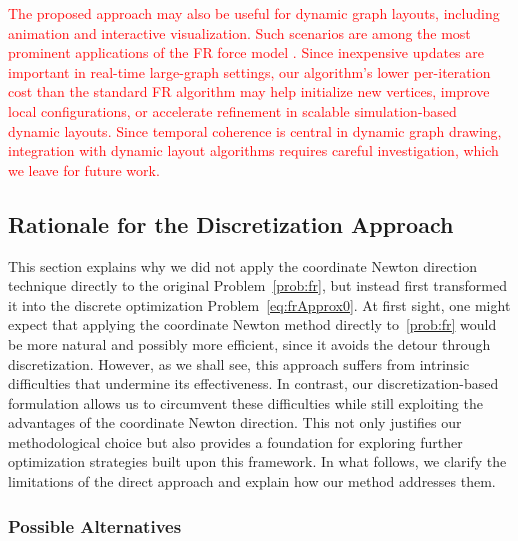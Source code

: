 \documentclass[11pt]{article}
\newcommand{\red}[1]{\textcolor{red}{#1}}
\begin{document}
\red{
  The proposed approach may also be useful for dynamic graph layouts, including animation and interactive visualization. Such scenarios are among the most prominent applications of the FR force model \citep{ertenGraphAELGraphAnimations2004,frishmanOnlineDynamicGraph2008}.
  Since inexpensive updates are important in real-time large-graph settings, our algorithm's lower per-iteration cost than the standard FR algorithm may help initialize new vertices, improve local configurations, or accelerate refinement in scalable simulation-based dynamic layouts.
  Since temporal coherence is central in dynamic graph drawing, integration with dynamic layout algorithms requires careful investigation, which we leave for future work.
}

\subsection{Rationale for the Discretization Approach}
\label{sec:rationale}

This section explains why we did not apply the coordinate Newton direction technique directly to the original Problem~\eqref{prob:fr}, but instead first transformed it into the discrete optimization Problem~\eqref{eq:frApprox0}.
At first sight, one might expect that applying the coordinate Newton method directly to~\eqref{prob:fr} would be more natural and possibly more efficient, since it avoids the detour through discretization.
However, as we shall see, this approach suffers from intrinsic difficulties that undermine its effectiveness.
In contrast, our discretization-based formulation allows us to circumvent these difficulties while still exploiting the advantages of the coordinate Newton direction.
This not only justifies our methodological choice but also provides a foundation for exploring further optimization strategies built upon this framework.
In what follows, we clarify the limitations of the direct approach and explain how our method addresses them.

\subsubsection{Possible Alternatives}
\label{ssec:possibleApproach}
\end{document}

